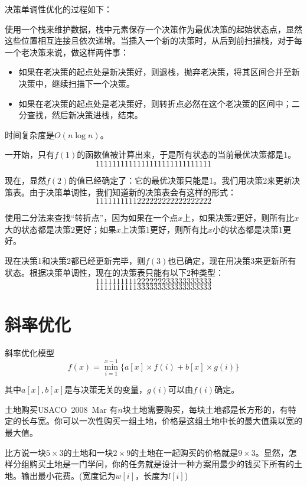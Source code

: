 \documentclass[9pt,dvipsnames,table,UTF8,aspectratio=169]{beamer}
\begin{document}
\begin{frame}
	决策单调性优化的过程如下：

	使用一个栈来维护数据，栈中元素保存一个决策作为最优决策的起始状态点，显然这些位置相互连接且依次递增。当插入一个新的决策时，从后到前扫描栈，对于每一个老决策来说，做这样两件事：

	\begin{itemize}
		\item 如果在老决策的起点处是新决策好，则退栈，抛弃老决策，将其区间合并至新决策中，继续扫描下一个决策。
		\item 如果在老决策的起点处是老决策好，则转折点必然在这个老决策的区间中；二分查找，然后新决策进栈，结束。
	\end{itemize}
	
	时间复杂度是$O(n\log{n})$。
\end{frame}	

\begin{frame}[shrink]
	一开始，只有$f(1)$的函数值被计算出来，于是所有状态的当前最优决策都是$1$。$$1111111111111111111111111111$$

	现在，显然$f(2)$的值已经确定了：它的最优决策只能是1。我们用决策2来更新决策表。由于决策单调性，我们知道新的决策表会有这样的形式：$$1111111111222222222222222222$$

	使用二分法来查找“转折点”，因为如果在一个点$x$上，如果决策$2$更好，则所有比$x$大的状态都是决策$2$更好；如果$x$上决策$1$更好，则所有比$x$小的状态都是决策$1$更好。

	现在决策1和决策2都已经更新完毕，则$f(3)$也已确定，现在用决策$3$来更新所有状态。根据决策单调性，现在的决策表只能有以下$2$种类型：$$1111111111222222233333333333$$ $$1111111111333333333333333333$$
\end{frame}

\section{斜率优化}
\begin{frame}{斜率优化模型}
	$$f(x) = \min_{i = 1}^{x - 1} \{a[x] \times f(i) + b[x] \times g(i)\}$$

	其中$a[x],b[x]$是与决策无关的变量，$g(i)$可以由$f(i)$确定。
\end{frame}

\begin{frame}{土地购买}{USACO\ 2008\ Mar}
	       有$n$块土地需要购买，每块土地都是长方形的，有特定的长与宽。你可以一次性购买一组土地，价格是这组土地中长的最大值乘以宽的最大值。
	       
	       比方说一块$5 \times 3$的土地和一块$2 \times 9$的土地在一起购买的价格就是$9 \times 3$。显然，怎样分组购买土地是一门学问，你的任务就是设计一种方案用最少的钱买下所有的土地。输出最小花费。(宽度记为$w[i]$，长度为$l[i]$)
\end{frame}
\end{document}
